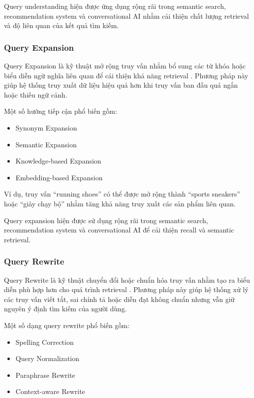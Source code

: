 Query understanding hiện được ứng dụng rộng rãi trong semantic search, recommendation system và conversational AI nhằm cải thiện chất lượng retrieval và độ liên quan của kết quả tìm kiếm.

\subsubsection{Query Expansion}

Query Expansion là kỹ thuật mở rộng truy vấn nhằm bổ sung các từ khóa hoặc biểu diễn ngữ nghĩa liên quan để cải thiện khả năng retrieval \parencite{carpineto2012survey}. Phương pháp này giúp hệ thống truy xuất dữ liệu hiệu quả hơn khi truy vấn ban đầu quá ngắn hoặc thiếu ngữ cảnh.

Một số hướng tiếp cận phổ biến gồm:

\begin{itemize}
    \item Synonym Expansion
    
    \item Semantic Expansion
    
    \item Knowledge-based Expansion
    
    \item Embedding-based Expansion
\end{itemize}

Ví dụ, truy vấn ``running shoes'' có thể được mở rộng thành ``sports sneakers'' hoặc ``giày chạy bộ'' nhằm tăng khả năng truy xuất các sản phẩm liên quan.

Query expansion hiện được sử dụng rộng rãi trong semantic search, recommendation system và conversational AI để cải thiện recall và semantic retrieval.

\subsubsection{Query Rewrite}

Query Rewrite là kỹ thuật chuyển đổi hoặc chuẩn hóa truy vấn nhằm tạo ra biểu diễn phù hợp hơn cho quá trình retrieval \parencite{ren2010query}. Phương pháp này giúp hệ thống xử lý các truy vấn viết tắt, sai chính tả hoặc diễn đạt không chuẩn nhưng vẫn giữ nguyên ý định tìm kiếm của người dùng.

Một số dạng query rewrite phổ biến gồm:

\begin{itemize}
    \item Spelling Correction
    
    \item Query Normalization
    
    \item Paraphrase Rewrite
    
    \item Context-aware Rewrite
\end{itemize}

